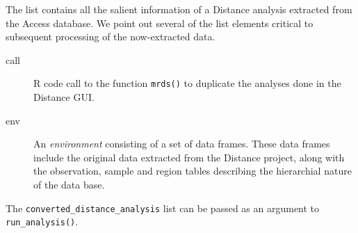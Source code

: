 \documentclass[14pt,a1paper,landscape]{tikzposter}
\begin{document}
\begin{columns}
\begin{subcolumns}
{	The list contains all the salient information of a Distance analysis extracted from the Access database.  We point out several of the list elements critical to subsequent processing of the now-extracted data.
	\begin{description}
		\item [call] R code call to the function \texttt{mrds()} to duplicate the analyses done in the Distance GUI.
		\item [env] An \textit{environment} consisting of a set of data frames.  These data frames include the original data extracted from the Distance project, along with the observation, sample and region tables describing the hierarchial nature of the data base.
	\end{description}
	
	The \texttt{converted\_distance\_analysis} list can be passed as an argument to \texttt{run\_analysis()}.
} 
\end{subcolumns}





\end{columns}
\end{document}
